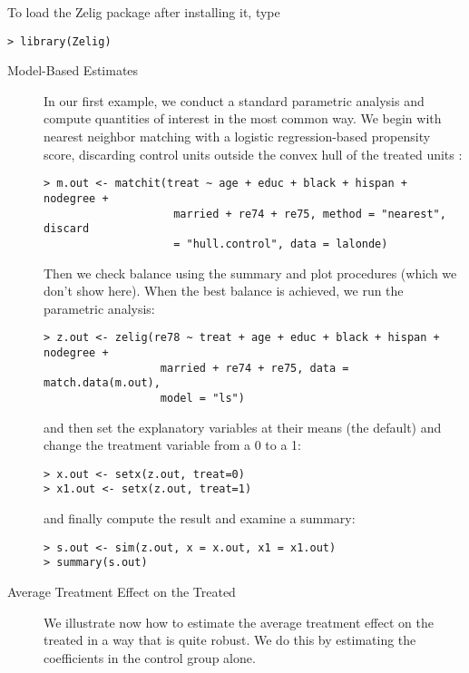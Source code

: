 To load the Zelig package after installing it, type
\begin{verbatim}
> library(Zelig)
\end{verbatim}

\begin{description}
\item[Model-Based Estimates] In our first example, we conduct a
  standard parametric analysis and compute quantities of interest in
  the most common way.  We begin with nearest neighbor matching with a
  logistic regression-based propensity score, discarding control units
  outside the convex hull of the treated units
  \citep{KinZen06,KinZen07}:
\begin{verbatim}
> m.out <- matchit(treat ~ age + educ + black + hispan + nodegree + 
                    married + re74 + re75, method = "nearest", discard
                    = "hull.control", data = lalonde)
\end{verbatim}
  Then we check balance using the summary and plot procedures (which
  we don't show here).  When the best balance is achieved, 
  we run the parametric analysis:
\begin{verbatim}
> z.out <- zelig(re78 ~ treat + age + educ + black + hispan + nodegree + 
                  married + re74 + re75, data = match.data(m.out), 
                  model = "ls")
\end{verbatim}
  and then set the explanatory variables at their means (the default)
  and change the treatment variable from a 0 to a 1:
\begin{verbatim}
> x.out <- setx(z.out, treat=0)
> x1.out <- setx(z.out, treat=1)
\end{verbatim}
and finally compute the result and examine a summary:
\begin{verbatim}
> s.out <- sim(z.out, x = x.out, x1 = x1.out)
> summary(s.out)
\end{verbatim}

\item[Average Treatment Effect on the Treated] We illustrate now how
  to estimate the average treatment effect on the treated in a way
  that is quite robust.  We do this by estimating the coefficients in
  the control group alone.


\end{description}
